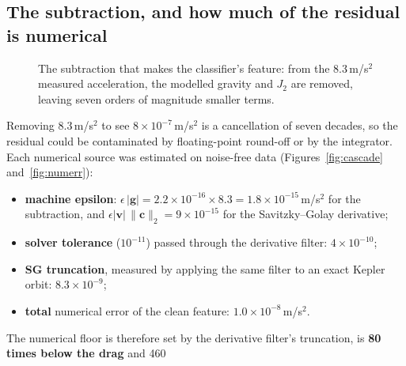 \documentclass[11pt,a4paper]{article}
\begin{document}
\subsection{The subtraction, and how much of the residual is numerical}
\begin{figure}[H]\centering
{}
\caption{The subtraction that makes the classifier's feature: from the 8.3\,m/s$^2$ measured acceleration, the modelled
gravity and $J_2$ are removed, leaving seven orders of magnitude smaller terms.}\label{fig:subtract}
\end{figure}
Removing 8.3\,m/s$^2$ to see $8\times10^{-7}$\,m/s$^2$ is a cancellation of seven decades, so the residual could be
contaminated by floating-point round-off or by the integrator. Each numerical source was estimated on noise-free data
(Figures~\ref{fig:cascade} and~\ref{fig:numerr}):
\begin{itemize}
  \item \textbf{machine epsilon}: $\epsilon\,|\mathbf g| = 2.2\times10^{-16}\times8.3 = 1.8\times10^{-15}$\,m/s$^2$ for the
        subtraction, and $\epsilon|\mathbf v|\,\|\mathbf c\|_2 = 9\times10^{-15}$ for the Savitzky--Golay derivative;
  \item \textbf{solver tolerance} ($10^{-11}$) passed through the derivative filter: $4\times10^{-10}$;
  \item \textbf{SG truncation}, measured by applying the same filter to an exact Kepler orbit: $8.3\times10^{-9}$;
  \item \textbf{total} numerical error of the clean feature: $1.0\times10^{-8}$\,m/s$^2$.
\end{itemize}
The numerical floor is therefore set by the derivative filter's truncation, is \textbf{80 times below the drag} and 460
\end{document}
